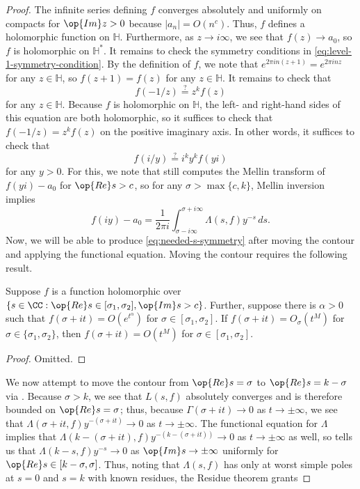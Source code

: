 \documentclass{amsart}
\begin{document}
\begin{proof}
	The infinite series defining $f$ converges absolutely and uniformly on compacts for $\op{Im}z>0$ because $|a_n|=O\left(n^c\right)$. Thus, $f$ defines a holomorphic function on $\mathbb H$. Furthermore, as $z\to i\infty$, we see that $f(z)\to a_0$, so $f$ is holomorphic on $\mathbb H^*$. It remains to check the symmetry conditions in \eqref{eq:level-1-symmetry-condition}. By the definition of $f$, we note that $e^{2\pi in(z+1)}=e^{2\pi inz}$ for any $z\in\mathbb H$, so $f(z+1)=f(z)$ for any $z\in\mathbb H$. It remains to check that
	\[f(-1/z)\stackrel?=z^kf(z)\]
	for any $z\in\mathbb H$. Because $f$ is holomorphic on $\mathbb H$, the left- and right-hand sides of this equation are both holomorphic, so it suffices to check that $f(-1/z)=z^kf(z)$ on the positive imaginary axis. In other words, it suffices to check that
	\begin{equation}
		f(i/y)\stackrel?=i^ky^kf(yi) \label{eq:needed-s-symmetry}
	\end{equation}
	for any $y>0$. For this, we note that  still computes the Mellin transform of $f(yi)-a_0$ for $\op{Re}s>c$, so for any $\sigma>\max\{c,k\}$, Mellin inversion implies
	\[f(iy)-a_0=\frac1{2\pi i}\int_{\sigma-i\infty}^{\sigma+i\infty}\Lambda(s,f)y^{-s}\,ds.\]
	Now, we will be able to produce \eqref{eq:needed-s-symmetry} after moving the contour and applying the functional equation. Moving the contour requires the following result.
	\begin{proposition} \label{prop:pl}
		Suppose $f$ is a function holomorphic over $\{s\in\CC:\op{Re}s\in[\sigma_1,\sigma_2],\op{Im}s>c\}$. Further, suppose there is $\alpha>0$ such that $f(\sigma+it)=O\left(e^{t^\alpha}\right)$ for $\sigma\in[\sigma_1,\sigma_2]$. If $f(\sigma+it)=O_\sigma\left(t^M\right)$ for $\sigma\in\{\sigma_1,\sigma_2\}$, then $f(\sigma+it)=O\left(t^M\right)$ for $\sigma\in[\sigma_1,\sigma_2]$.
	\end{proposition}
	\begin{proof}
		Omitted.
	\end{proof}
	We now attempt to move the contour from $\op{Re}s=\sigma$ to $\op{Re}s=k-\sigma$ via . Because $\sigma>k$, we see that $L(s,f)$ absolutely converges and is therefore bounded on $\op{Re}s=\sigma$; thus, because $\Gamma(\sigma+it)\to0$ as $t\to\pm\infty$, we see that $\Lambda(\sigma+it,f)y^{-(\sigma+it)}\to0$ as $t\to\pm\infty$. The functional equation for $\Lambda$ implies that $\Lambda(k-(\sigma+it),f)y^{-(k-(\sigma+it))}\to0$ as $t\to\pm\infty$ as well, so  tells us that $\Lambda(k-s,f)y^{-s}\to0$ as $\op{Im}s\to\pm\infty$ uniformly for $\op{Re}s\in[k-\sigma,\sigma]$. Thus, noting that $\Lambda(s,f)$ has only at worst simple poles at $s=0$ and $s=k$ with known residues, the Residue theorem grants

\end{proof}
\end{document}
